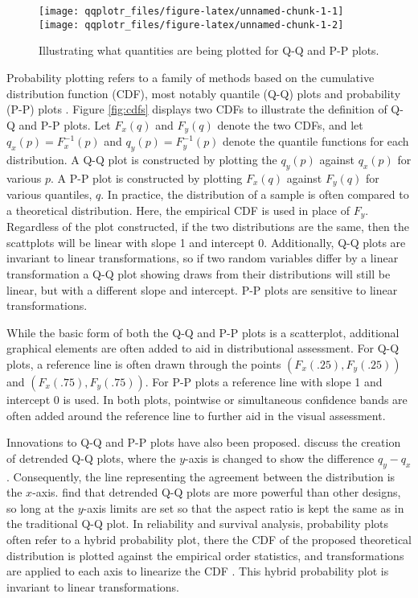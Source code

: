 \begin{Schunk}
\begin{figure}

{\centering \texttt{[image: qqplotr\_files/figure-latex/unnamed-chunk-1-1]} \texttt{[image: qqplotr\_files/figure-latex/unnamed-chunk-1-2]} 

}

\caption{\label{fig:cdfs}Illustrating what quantities are being plotted for Q-Q and P-P plots.}\label{fig:unnamed-chunk-1}
\end{figure}
\end{Schunk}

Probability plotting refers to a family of methods based on the
cumulative distribution function (CDF), most notably quantile (Q-Q)
plots and probability (P-P) plots \citep{Wilk1968-ii}. Figure
\ref{fig:cdfs} displays two CDFs to illustrate the definition of Q-Q and
P-P plots. Let \(F_x(q)\) and \(F_y(q)\) denote the two CDFs, and let
\(q_x(p) = F_x^{-1}(p)\) and \(q_y(p) = F_y^{-1}(p)\) denote the
quantile functions for each distribution. A Q-Q plot is constructed by
plotting the \(q_y(p)\) against \(q_x(p)\) for various \(p\). A P-P plot
is constructed by plotting \(F_x(q)\) against \(F_y(q)\) for various
quantiles, \(q\). In practice, the distribution of a sample is often
compared to a theoretical distribution. Here, the empirical CDF is used
in place of \(F_y\). Regardless of the plot constructed, if the two
distributions are the same, then the scattplots will be linear with
slope 1 and intercept 0. Additionally, Q-Q plots are invariant to linear
transformations, so if two random variables differ by a linear
transformation a Q-Q plot showing draws from their distributions will
still be linear, but with a different slope and intercept. P-P plots are
sensitive to linear transformations.

While the basic form of both the Q-Q and P-P plots is a scatterplot,
additional graphical elements are often added to aid in distributional
assessment. For Q-Q plots, a reference line is often drawn through the
points \((F_x(.25), F_y(.25))\) and \((F_x(.75), F_y(.75))\). For P-P
plots a reference line with slope 1 and intercept 0 is used. In both
plots, pointwise or simultaneous confidence bands are often added around
the reference line to further aid in the visual assessment.

Innovations to Q-Q and P-P plots have also been proposed.
\citet{Loy2016-fg} discuss the creation of detrended Q-Q plots, where
the \(y\)-axis is changed to show the difference \(q_y - q_x\).
Consequently, the line representing the agreement between the
distribution is the \(x\)-axis. \citet{Loy2016-fg} find that detrended
Q-Q plots are more powerful than other designs, so long at the
\(y\)-axis limits are set so that the aspect ratio is kept the same as
in the traditional Q-Q plot. In reliability and survival analysis,
probability plots often refer to a hybrid probability plot, there the
CDF of the proposed theoretical distribution is plotted against the
empirical order statistics, and transformations are applied to each axis
to linearize the CDF \citep[cf.][chapter 6]{Meeker1998}. This hybrid
probability plot is invariant to linear transformations.

